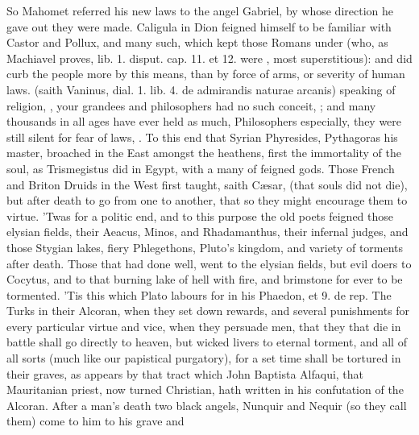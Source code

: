 {So Mahomet referred his new laws to the angel Gabriel, by whose
direction he gave out they were made. Caligula in Dion feigned himself
to be familiar with Castor and Pollux, and many such, which kept those
Romans under (who, as Machiavel proves, \textlatin{lib. 1. disput. cap. 11. et 12.}
were , most superstitious): and did curb the
people more by this means, than by force of arms, or severity of human
laws.  (saith Vaninus, \textlatin{dial. 1. lib. 4. de
admirandis naturae arcanis}) speaking of religion, , your grandees and philosophers
had no such conceit, ; and many thousands
in all ages have ever held as much, Philosophers especially,
 they were still silent for fear of laws,
\etc{}. To this end that Syrian Phyresides, Pythagoras his master, broached
in the East amongst the heathens, first the immortality of the soul, as
Trismegistus did in Egypt, with a many of feigned gods. Those French
and Briton Druids in the West first taught, saith C\ae{}sar,  (that souls did not die), but after death to go from
one to another, that so they might encourage them to virtue. 'Twas for
a politic end, and to this purpose the old poets feigned those
elysian fields, their Aeacus, Minos, and Rhadamanthus, their infernal
judges, and those Stygian lakes, fiery Phlegethons, Pluto's kingdom,
and variety of torments after death. Those that had done well, went to
the elysian fields, but evil doers to Cocytus, and to that burning lake
of hell with fire, and brimstone for ever to be tormented. 'Tis
this which Plato labours for in his Phaedon, \textlatin{et 9. de rep.} The
Turks in their Alcoran, when they set down rewards, and several
punishments for every particular virtue and vice, when they
persuade men, that they that die in battle shall go directly to heaven,
but wicked livers to eternal torment, and all of all sorts (much like
our papistical purgatory), for a set time shall be tortured in their
graves, as appears by that tract which John Baptista Alfaqui, that
Mauritanian priest, now turned Christian, hath written in his
confutation of the Alcoran. After a man's death two black angels,
Nunquir and Nequir (so they call them) come to him to his grave and
}
